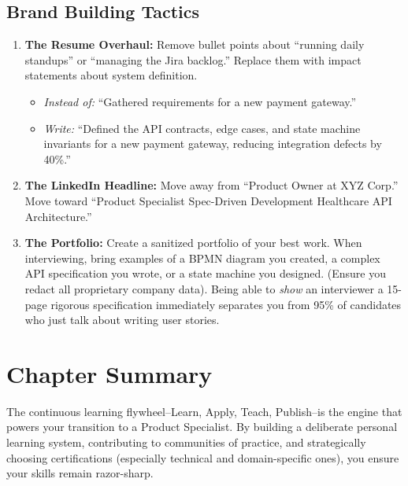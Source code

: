 \documentclass[
  11pt,
  openany,
  oneside]{book}
\providecommand{\tightlist}{%
  \setlength{\itemsep}{0pt}\setlength{\parskip}{0pt}}
\begin{document}
\subsection{Brand Building Tactics}\label{brand-building-tactics}

\begin{enumerate}
\def\labelenumi{\arabic{enumi}.}
\tightlist
\item
  \textbf{The Resume Overhaul:} Remove bullet points about ``running
  daily standups'' or ``managing the Jira backlog.'' Replace them with
  impact statements about system definition.

  \begin{itemize}
  \tightlist
  \item
    \emph{Instead of:} ``Gathered requirements for a new payment
    gateway.''
  \item
    \emph{Write:} ``Defined the API contracts, edge cases, and state
    machine invariants for a new payment gateway, reducing integration
    defects by 40\%.''
  \end{itemize}
\item
  \textbf{The LinkedIn Headline:} Move away from ``Product Owner at XYZ
  Corp.'' Move toward ``Product Specialist \textbar{} Spec-Driven
  Development \textbar{} Healthcare API Architecture.''
\item
  \textbf{The Portfolio:} Create a sanitized portfolio of your best
  work. When interviewing, bring examples of a BPMN diagram you created,
  a complex API specification you wrote, or a state machine you
  designed. (Ensure you redact all proprietary company data). Being able
  to \emph{show} an interviewer a 15-page rigorous specification
  immediately separates you from 95\% of candidates who just talk about
  writing user stories.
\end{enumerate}

\bigskip

\section{Chapter Summary}\label{chapter-summary}

The continuous learning flywheel--Learn, Apply, Teach, Publish--is the
engine that powers your transition to a Product Specialist. By building
a deliberate personal learning system, contributing to communities of
practice, and strategically choosing certifications (especially
technical and domain-specific ones), you ensure your skills remain
razor-sharp.
\end{document}
